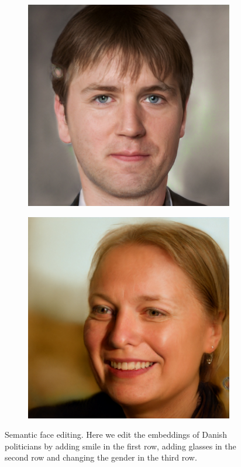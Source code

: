 \begin{figure}[h!]
\begin{subfigure}[b]{0.24\textwidth}
    \end{subfigure}
    \begin{subfigure}[b]{0.24\textwidth}
        \includegraphics[width=\textwidth]{fig/stylegan/faceedit/mette-gender}
    \end{subfigure}
    \begin{subfigure}[b]{0.24\textwidth}
        \includegraphics[width=\textwidth]{fig/stylegan/faceedit/uffe-gender}
    \end{subfigure}
    \caption{Semantic face editing. Here we edit the embeddings of Danish politicians by adding smile in the first row, adding glasses in the second row and changing the gender in the third row.}
    \label{faceedit}
\end{figure}
